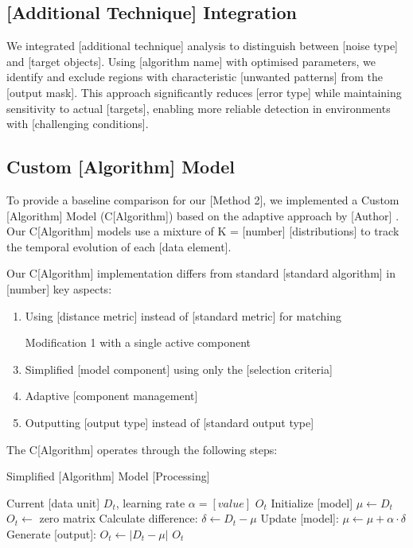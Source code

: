 \subsection{[Additional Technique] Integration}

We integrated [additional technique] analysis to distinguish between [noise type] and [target objects]. Using [algorithm name] \cite{sample2003reference} with optimised parameters, we identify and exclude regions with characteristic [unwanted patterns] from the [output mask]. This approach significantly reduces [error type] while maintaining sensitivity to actual [targets], enabling more reliable detection in environments with [challenging conditions].

\subsection{Custom [Algorithm] Model}

To provide a baseline comparison for our [Method 2], we implemented a Custom [Algorithm] Model (C[Algorithm]) based on the adaptive approach by [Author] \cite{sample2004reference, sample2006reference}. Our C[Algorithm] models use a mixture of K = [number] [distributions] to track the temporal evolution of each [data element].

Our C[Algorithm] implementation differs from standard [standard algorithm] in [number] key aspects:
\begin{enumerate}
\item Using [distance metric] instead of [standard metric] for matching
\item [Modification 1] with a single active component
\item Simplified [model component] using only the [selection criteria]
\item Adaptive [component management]
\item Outputting [output type] instead of [standard output type]
\end{enumerate}

The C[Algorithm] operates through the following steps:

\begin{algorithm}[!ht]
\caption{Simplified [Algorithm] Model [Processing]}
\label{alg:custom_algorithm}
\begin{algorithmic}[1]
\REQUIRE Current [data unit] $D_t$, learning rate $\alpha=[value]$
\ENSURE [Output] $O_t$
    \STATE Initialize [model] $\mu \leftarrow D_t$
    \STATE $O_t \leftarrow$ zero matrix
\ELSE
    \STATE Calculate difference: $\delta \leftarrow D_t - \mu$
    \STATE Update [model]: $\mu \leftarrow \mu + \alpha \cdot \delta$
    \STATE Generate [output]: $O_t \leftarrow |D_t - \mu|$
\ENDIF
\RETURN $O_t$
\end{algorithmic}
\end{algorithm}

